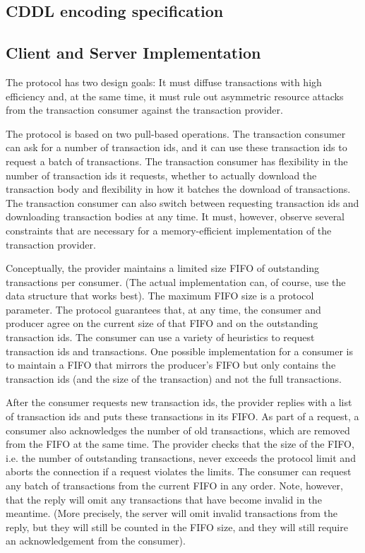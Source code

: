 \subsection{CDDL encoding specification}\label{tx-submission2-cddl}


\subsection{Client and Server Implementation}
The protocol has two design goals: It must diffuse transactions with high efficiency
and, at the same time, it must rule out
asymmetric resource attacks from the transaction consumer against the transaction provider.

The protocol is based on two pull-based operations.
The transaction consumer can ask for a number of transaction ids, and it can use these
transaction ids to request a batch of transactions.
The transaction consumer has flexibility in the number of transaction ids it requests,
whether to actually download the transaction body
and flexibility in how it batches the download of transactions.
The transaction consumer can also switch between requesting transaction ids and downloading
transaction bodies at any time.
It must, however, observe several constraints that are necessary for a memory-efficient implementation
of the transaction provider.

Conceptually, the provider maintains a limited size FIFO of outstanding transactions per consumer.
(The actual implementation can, of course, use the data structure that works best).
The maximum FIFO size is a protocol parameter.
The protocol guarantees that, at any time, the consumer and producer agree on the current size of
that FIFO and on the outstanding transaction ids.
The consumer can use a variety of heuristics to request transaction ids and transactions.
One possible implementation for a consumer is to maintain a FIFO that mirrors the producer's FIFO
but only contains the transaction ids (and the size of the transaction) and not the full transactions.

After the consumer requests new transaction ids, the provider replies with a list of transaction ids and
puts these transactions in its FIFO.
As part of a request, a consumer also acknowledges the number of old transactions,
which are removed from the FIFO at the same time.
The provider checks that the size of the FIFO, i.e. the number of outstanding transactions,
never exceeds the protocol limit and aborts the connection if a request violates the limits.
The consumer can request any batch of transactions from the current FIFO in any order.
Note, however, that the reply will omit any transactions that have become invalid in the meantime.
(More precisely, the server will omit invalid transactions from the reply, but they will still be counted in the FIFO
size, and they will still require an acknowledgement from the consumer).

